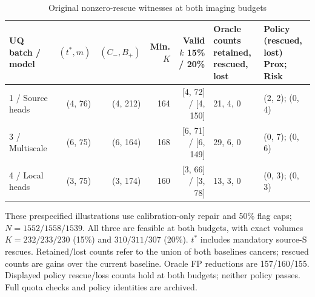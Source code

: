 \begin{table}[!t]
\caption{Original nonzero-rescue witnesses at both imaging budgets}\label{tab:repairwitnessfull}
\centering\small\renewcommand{\arraystretch}{1.04}\setlength{\tabcolsep}{3pt}
\begin{tabular*}{\textwidth}{@{\extracolsep{\fill}}lrrrrll@{}}\toprule
UQ batch / model & $(t^*,m)$ & $(C_-,B_+)$ & Min. $K$ & \shortstack{Valid $k$\\15\% / 20\%} & \shortstack{Oracle counts\\retained, rescued, lost} & \shortstack{Policy (rescued, lost)\\Prox; Risk}\\\midrule
1 / Source heads & (4, 76) & (4, 212) & 164 & [4, 72] / [4, 150] & 21, 4, 0 & (2, 2); (0, 4)\\
3 / Multiscale & (6, 75) & (6, 164) & 168 & [6, 71] / [6, 149] & 29, 6, 0 & (0, 7); (0, 6)\\
4 / Local heads & (3, 75) & (3, 174) & 160 & [3, 66] / [3, 78] & 13, 3, 0 & (0, 3); (0, 3)\\
\bottomrule\end{tabular*}
\par\smallskip\parbox{\linewidth}{\footnotesize These prespecified illustrations use calibration-only repair and 50\% flag caps; $N=1552/1558/1539$. All three are feasible at both budgets, with exact volumes $K=232/233/230$ (15\%) and $310/311/307$ (20\%). $t^*$ includes mandatory source-S rescues. Retained/lost counts refer to the union of both baselines\textquotesingle{} cancers; rescued counts are gains over the current baseline. Oracle FP reductions are 157/160/155. Displayed policy rescue/loss counts hold at both budgets; neither policy passes. Full quota checks and policy identities are archived.}
\end{table}

